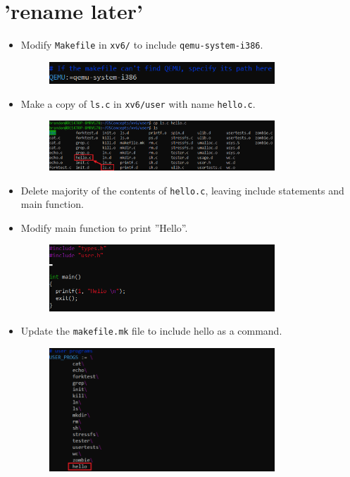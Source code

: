 \documentclass[a4paper]{article}
\begin{document}
	\section*{'rename later'}
	\begin{itemize}
		\item Modify \verb|Makefile| in \verb|xv6/| to include \verb|qemu-system-i386|.
			\begin{figure}[ht!]
				\centering
				\includegraphics[width=0.8\textwidth]{1}
			\end{figure}
		\item Make a copy of \verb|ls.c| in \verb|xv6/user| with name \verb|hello.c|.
			\begin{figure}[ht!]
				\centering
				\includegraphics[width=0.8\textwidth]{2}
			\end{figure}
		\item Delete majority of the contents of \verb|hello.c|, leaving include statements
			and main function.
		\item Modify main function to print ''Hello''.
			\begin{figure}[ht!]
				\centering
				\includegraphics[width=0.8\textwidth]{3}
			\end{figure}
		\item Update the \verb|makefile.mk| file to include hello as a command.
			\begin{figure}[ht!]
				\centering
				\includegraphics[width=0.8\textwidth]{4}

\end{figure}
\end{itemize}
\end{document}
